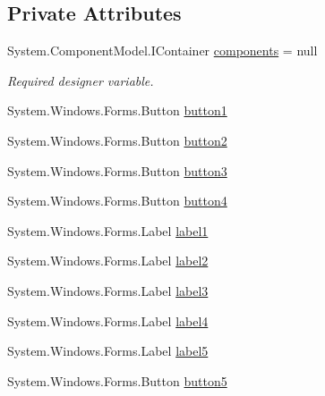 \subsection*{Private Attributes}
\begin{DoxyCompactItemize}
\item 
System.\+Component\+Model.\+I\+Container \hyperlink{classProject__Codename__Olympia__v1_1_1__0_1_1Form1_afc1f1595dbcf8ab191592c6930301a0f}{components} = null
\begin{DoxyCompactList}\small\item\em Required designer variable. \end{DoxyCompactList}\item 
System.\+Windows.\+Forms.\+Button \hyperlink{classProject__Codename__Olympia__v1_1_1__0_1_1Form1_a5656361ec4351d173db39628515c9a5a}{button1}
\item 
System.\+Windows.\+Forms.\+Button \hyperlink{classProject__Codename__Olympia__v1_1_1__0_1_1Form1_a642b0136b529a2ce0b193657ea742059}{button2}
\item 
System.\+Windows.\+Forms.\+Button \hyperlink{classProject__Codename__Olympia__v1_1_1__0_1_1Form1_afc577c228081df6efa01a0dc28e5f209}{button3}
\item 
System.\+Windows.\+Forms.\+Button \hyperlink{classProject__Codename__Olympia__v1_1_1__0_1_1Form1_ac04935f86732650f5f64798f289e2017}{button4}
\item 
System.\+Windows.\+Forms.\+Label \hyperlink{classProject__Codename__Olympia__v1_1_1__0_1_1Form1_a37bc2a4e841f3a2b5ca4ff064f0d2a9c}{label1}
\item 
System.\+Windows.\+Forms.\+Label \hyperlink{classProject__Codename__Olympia__v1_1_1__0_1_1Form1_a8f282aae1178b3cc1b18ee8f37115b53}{label2}
\item 
System.\+Windows.\+Forms.\+Label \hyperlink{classProject__Codename__Olympia__v1_1_1__0_1_1Form1_a79cfe899ae6a084d7fe28674e7fab51c}{label3}
\item 
System.\+Windows.\+Forms.\+Label \hyperlink{classProject__Codename__Olympia__v1_1_1__0_1_1Form1_a948d2092c62f8251d48232e6c1fe1813}{label4}
\item 
System.\+Windows.\+Forms.\+Label \hyperlink{classProject__Codename__Olympia__v1_1_1__0_1_1Form1_adac4bdce2b9b0118cb9344967ce6d851}{label5}
\item 
System.\+Windows.\+Forms.\+Button \hyperlink{classProject__Codename__Olympia__v1_1_1__0_1_1Form1_a0af2249b8906aca5a318040729e95fc0}{button5}
\end{DoxyCompactItemize}


